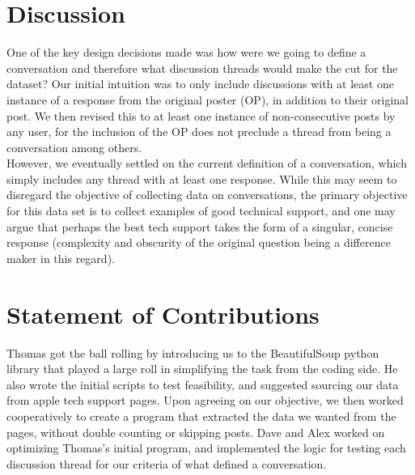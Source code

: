 \documentclass[12pt]{article}
\begin{document}

\section{Discussion}
One of the key design decisions made was how were we going to define a conversation and therefore what discussion threads would make the cut for the dataset? Our initial intuition was to only include discussions with at least one instance of a response from the original poster (OP), in addition to their original post. We then revised this to at least one instance of non-consecutive posts by any user, for the inclusion of the OP does not preclude a thread from being a conversation among others.\\

However, we eventually settled on the current definition of a conversation, which simply includes any thread with at least one response. While this may seem to disregard the objective of collecting data on conversations, the primary objective for this data set is to collect examples of good technical support, and one may argue that perhaps the best tech support takes the form of a singular, concise response (complexity and obscurity of the original question being a difference maker in this regard).





\section{Statement of Contributions}
Thomas got the ball rolling by introducing us to the BeautifulSoup python library that played a large roll in simplifying the task from the coding side. He also wrote the initial scripts to test feasibility, and suggested sourcing our data from apple tech support pages. Upon agreeing on our objective, we then worked cooperatively to create a program that extracted the data we wanted from the pages, without double counting or skipping posts. Dave and Alex worked on optimizing Thomas's initial program, and implemented the logic for testing each discussion thread for our criteria of what defined a conversation. \\
\end{document}
